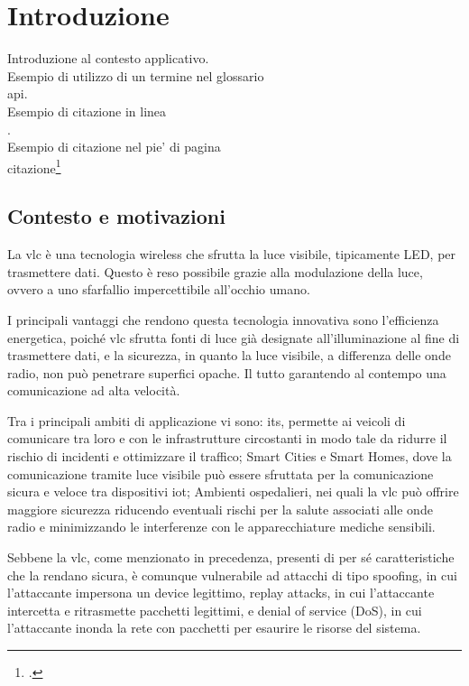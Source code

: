 \chapter{Introduzione}
\label{cap:introduzione}

Introduzione al contesto applicativo.\\

\noindent Esempio di utilizzo di un termine nel glossario \\
\gls{api}. \\

\noindent Esempio di citazione in linea \\
\cite{site:agile-manifesto}. \\

\noindent Esempio di citazione nel pie' di pagina \\
citazione\footcite{womak:lean-thinking} \\

\section{Contesto e motivazioni}
La \gls{vlc} è una tecnologia wireless che sfrutta la luce visibile, tipicamente LED, per trasmettere dati. Questo è reso possibile grazie alla modulazione della luce, ovvero a uno sfarfallio impercettibile all'occhio umano.

I principali vantaggi che rendono questa tecnologia innovativa sono l'efficienza energetica, poiché \gls{vlc} sfrutta fonti di luce già designate all'illuminazione al fine di trasmettere dati, e la sicurezza, in quanto la luce visibile, a differenza delle onde radio, non può penetrare superfici opache. Il tutto garantendo al contempo una comunicazione ad alta velocità.

Tra i principali ambiti di applicazione vi sono: \gls{its}, permette ai veicoli di comunicare tra loro e con le infrastrutture circostanti in modo tale da ridurre il rischio di incidenti e ottimizzare il traffico; Smart Cities e Smart Homes, dove la comunicazione tramite luce visibile può essere sfruttata per la comunicazione sicura e veloce tra dispositivi \gls{iot}; Ambienti ospedalieri, nei quali la \gls{vlc} può offrire maggiore sicurezza riducendo eventuali rischi per la salute associati alle onde radio e minimizzando le interferenze con le apparecchiature mediche sensibili.

Sebbene la \gls{vlc}, come menzionato in precedenza, presenti di per sé caratteristiche che la rendano sicura, è comunque vulnerabile ad attacchi di tipo spoofing, in cui l'attaccante impersona un device legittimo, replay attacks, in cui l'attaccante intercetta e ritrasmette pacchetti legittimi, e denial of service (DoS), in cui l'attaccante inonda la rete con pacchetti per esaurire le risorse del sistema.

